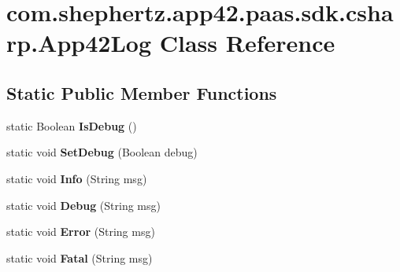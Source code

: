 \hypertarget{classcom_1_1shephertz_1_1app42_1_1paas_1_1sdk_1_1csharp_1_1_app42_log}{\section{com.\+shephertz.\+app42.\+paas.\+sdk.\+csharp.\+App42\+Log Class Reference}
\label{classcom_1_1shephertz_1_1app42_1_1paas_1_1sdk_1_1csharp_1_1_app42_log}
}
\subsection*{Static Public Member Functions}
\begin{DoxyCompactItemize}
\item 
\hypertarget{classcom_1_1shephertz_1_1app42_1_1paas_1_1sdk_1_1csharp_1_1_app42_log_adb5e263d6e53b2f8dee87b7fc78c610a}{static Boolean {\bfseries Is\+Debug} ()}\label{classcom_1_1shephertz_1_1app42_1_1paas_1_1sdk_1_1csharp_1_1_app42_log_adb5e263d6e53b2f8dee87b7fc78c610a}

\item 
\hypertarget{classcom_1_1shephertz_1_1app42_1_1paas_1_1sdk_1_1csharp_1_1_app42_log_a81b909779f6b59d636c541e91025f196}{static void {\bfseries Set\+Debug} (Boolean debug)}\label{classcom_1_1shephertz_1_1app42_1_1paas_1_1sdk_1_1csharp_1_1_app42_log_a81b909779f6b59d636c541e91025f196}

\item 
\hypertarget{classcom_1_1shephertz_1_1app42_1_1paas_1_1sdk_1_1csharp_1_1_app42_log_afde7ffc983889673509acca0d61d3660}{static void {\bfseries Info} (String msg)}\label{classcom_1_1shephertz_1_1app42_1_1paas_1_1sdk_1_1csharp_1_1_app42_log_afde7ffc983889673509acca0d61d3660}

\item 
\hypertarget{classcom_1_1shephertz_1_1app42_1_1paas_1_1sdk_1_1csharp_1_1_app42_log_a62332d48f53fceb9361b2c6f2ede418e}{static void {\bfseries Debug} (String msg)}\label{classcom_1_1shephertz_1_1app42_1_1paas_1_1sdk_1_1csharp_1_1_app42_log_a62332d48f53fceb9361b2c6f2ede418e}

\item 
\hypertarget{classcom_1_1shephertz_1_1app42_1_1paas_1_1sdk_1_1csharp_1_1_app42_log_a54a0a5304c02e5fe03435d026aaf911c}{static void {\bfseries Error} (String msg)}\label{classcom_1_1shephertz_1_1app42_1_1paas_1_1sdk_1_1csharp_1_1_app42_log_a54a0a5304c02e5fe03435d026aaf911c}

\item 
\hypertarget{classcom_1_1shephertz_1_1app42_1_1paas_1_1sdk_1_1csharp_1_1_app42_log_a638de1ffa48d5d7b6db8302a307d093d}{static void {\bfseries Fatal} (String msg)}\label{classcom_1_1shephertz_1_1app42_1_1paas_1_1sdk_1_1csharp_1_1_app42_log_a638de1ffa48d5d7b6db8302a307d093d}

\end{DoxyCompactItemize}
